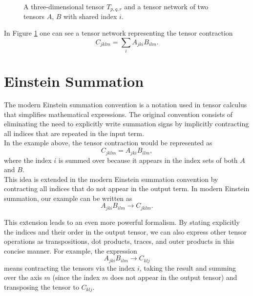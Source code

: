 \begin{figure}
\begin{center}
\caption{A three-dimensional tensor $T_{p,q,r}$ and a tensor network of two tensors $A$, $B$ with shared index $i$.}
\label{fig:tensor_network}
\end{center}
\end{figure}

\noindent In Figure \ref{fig:tensor_network} one can see a tensor network representing the tensor contraction 
$$
C_{jklm} = \sum_{i} A_{jki} B_{ilm}.
$$

\section{Einstein Summation}
The modern Einstein summation convention is a notation used in tensor calculus that simplifies mathematical expressions. The original convention consists of eliminating the need to explicitly write summation signs by implicitly contracting all indices that are repeated in the input term. \\
In the example above, the tensor contraction would be represented as
$$C_{jklm} = A_{jki} B_{ilm} ,$$
\noindent where the index $i$ is summed over because it appears in the index sets of both $A$ and $B$.\\
This idea is extended in the modern Einstein summation convention by contracting all indices that do not appear in the output term. In modern Einstein summation, our example can be written as
$$A_{jki} B_{ilm} \rightarrow C_{jklm}.$$

\noindent This extension leads to an even more powerful formalism. By stating explicitly the indices and their order in the output tensor, we can also express other tensor operations as transpositions, dot products, traces, and outer products in this concise manner.
For example, the expression
$$A_{jki} B_{ilm} \rightarrow C_{klj}$$
means contracting the tensors via the index $i$, taking the result and summing over the axis $m$ (since the index $m$ does not appear in the output tensor) and transposing the tensor to $ C_{klj}$. \\

